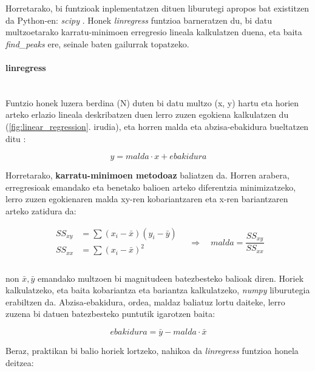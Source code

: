 \documentclass[12pt]{article}
\numberwithin{figure}{section}
\numberwithin{equation}{section}
\begin{document}
Horretarako, bi funtzioak inplementatzen dituen liburutegi apropos bat existitzen da Python-en: \textit{scipy} \cite{scipy_scipystats_2025}. Honek \textit{linregress} funtzioa barneratzen du, bi datu multzoetarako karratu-minimoen erregresio lineala kalkulatzen duena, eta baita \textit{find\_peaks} ere, seinale baten gailurrak topatzeko.

\paragraph{linregress} \leavevmode\\

Funtzio honek luzera berdina (N) duten bi datu multzo (x, y) hartu eta horien arteko erlazio lineala deskribatzen duen lerro zuzen egokiena kalkulatzen du (\ref{fig:linear_regression}. irudia), eta horren malda eta abzisa-ebakidura bueltatzen ditu \cite{scipy_scipystats_2025}:

\begin{equation}
    y = malda \cdot x + ebakidura
\end{equation}

Horretarako, \textbf{karratu-minimoen metodoaz} baliatzen da. Horren arabera, erregresioak emandako eta benetako balioen arteko diferentzia minimizatzeko, lerro zuzen egokienaren malda xy-ren kobariantzaren eta x-ren bariantzaren arteko zatidura da:

\begin{equation}
    \begin{aligned}
        SS_{xy} &= \sum (x_i - \bar{x})(y_i - \bar{y})\\
        SS_{xx} &= \sum (x_i-\bar{x})^2 \\
    \end{aligned}
    \quad
    \Longrightarrow
    \quad
    malda = \frac{SS_{xy}}{SS_{xx}}
\end{equation}\\
non $\bar{x},\bar{y}$ emandako multzoen bi magnitudeen batezbesteko balioak diren. Horiek kalkulatzeko, eta baita kobariantza eta bariantza kalkulatzeko, \textit{numpy} liburutegia erabiltzen da. Abzisa-ebakidura, ordea, maldaz baliatuz lortu daiteke, lerro zuzena bi datuen batezbesteko puntutik igarotzen baita:

\begin{equation}
    ebakidura = \bar{y}-malda \cdot \bar{x}
\end{equation}

Beraz, praktikan bi balio horiek lortzeko, nahikoa da \textit{linregress} funtzioa honela deitzea:
\end{document}

